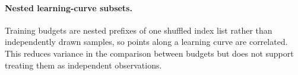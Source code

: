 \paragraph{Nested learning-curve subsets.}
Training budgets are nested prefixes of one shuffled index list rather than
independently drawn samples, so points along a learning curve are correlated.
This reduces variance in the comparison between budgets but does not support
treating them as independent observations.

